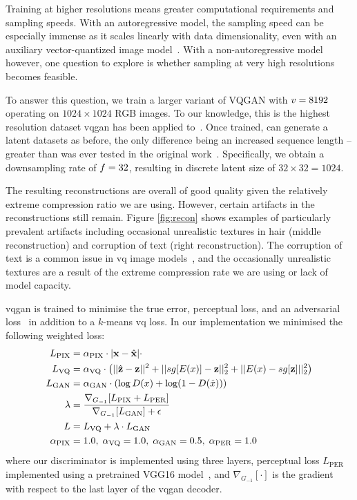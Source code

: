 Training at higher resolutions means greater computational requirements and
sampling speeds. With an autoregressive model, the sampling speed can be
especially immense as it scales linearly with data dimensionality, even with an
auxiliary vector-quantized image model~\cite{esser2021taming}. With a
non-autoregressive model however, one question to explore is whether sampling at
very high resolutions becomes feasible.

To answer this question, we train a larger variant of VQGAN with
$v = 8192$ operating on $1024 \times 1024$ RGB images. To our
knowledge, this is the highest resolution dataset \gls{vqgan} has been applied
to~\cite{esser2021taming}. Once trained, can generate a latent datasets as
before, the only difference being an increased sequence length -- greater than
was ever tested in the original work~\cite{savinov2022stepunrolled}.
Specifically, we obtain a downsampling rate of $f=32$, resulting
in discrete latent size of $32 \times 32 = 1024$.

The resulting reconstructions are overall of good quality given the relatively
extreme compression ratio we are using. However, certain artifacts in the
reconstructions still remain. Figure \ref{fig:recon} shows examples of
particularly prevalent artifacts including occasional unrealistic textures in
hair (middle reconstruction) and corruption of text (right reconstruction). The
corruption of text is a common issue in \gls{vq} image
models~\cite{ramesh2021dalle}, and the occasionally unrealistic textures are a
result of the extreme compression rate we are using or lack of model capacity.

\Gls{vqgan} is trained to minimise the true error, perceptual loss, and an
adversarial loss~\cite{esser2021taming} in addition to a $k$-means \gls{vq}
loss. In our implementation we minimised the following weighted loss:
\begin{align}
\begin{split}
    L_\text{PIX} &= \alpha_\text{PIX} \cdot |\mathbf{x} - \hat{\mathbf{x}}| \cdot \\
    L_\text{VQ} &= \alpha_\text{VQ} \cdot \left(||\hat{\mathbf{z}} -
    \mathbf{z}||^2 + ||sg[E(x)] - \mathbf{z}||^2_2 + ||E(x) -
    sg[\mathbf{z}]||^2_2\right)\\
    L_\text{GAN} &= \alpha_\text{GAN} \cdot \left(\log D(x) + \log
    (1-D(\hat{x}))\right) \\
    \lambda &= \frac{\nabla_{G_{-1}}[L_\text{PIX} +
    L_\text{PER}]}{\nabla_{G_{-1}}[L_\text{GAN}] + \epsilon}\\
    L &= L_\text{VQ} + \lambda \cdot L_\text{GAN}\\
    \alpha_\text{PIX} &= 1.0,\; \alpha_\text{VQ} = 1.0,\; \alpha_\text{GAN} = 0.5,\; \alpha_\text{PER} = 1.0
\end{split}
\end{align}
where our discriminator is implemented using three layers, perceptual loss
$L_\text{PER}$ implemented using a pretrained VGG16
model~\cite{karen2014vg18}, and $\nabla_{G_{-1}}[\cdot]$ is the gradient with
respect to the last layer of the \gls{vqgan} decoder.

